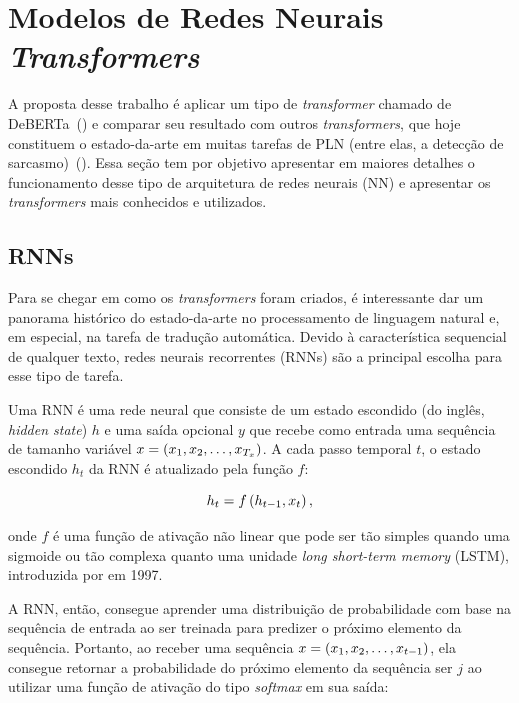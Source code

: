 \section{Modelos de Redes Neurais \textit{Transformers}}%
\label{sec:modelos_de_redes_neurais_transformers}

A proposta desse trabalho é aplicar um tipo de \textit{transformer} chamado de
DeBERTa~(\cite{he-etal:2020:deberta}) e comparar seu resultado com outros
\textit{transformers}, que hoje constituem o estado-da-arte em muitas tarefas de
PLN (entre elas, a detecção de
sarcasmo)~(\cite{joshi:2017:sarcasm-detection-survey}).  Essa seção tem por
objetivo apresentar em maiores detalhes o funcionamento desse tipo de
arquitetura de redes neurais (NN) e apresentar os \textit{transformers} mais
conhecidos e utilizados.

\subsection{RNNs}%
\label{sub:rnns}

Para se chegar em como os \textit{transformers} foram criados, é interessante
dar um panorama histórico do estado-da-arte no processamento de linguagem
natural e, em especial, na tarefa de tradução automática. Devido à
característica sequencial de qualquer texto, redes neurais recorrentes (RNNs)
são a principal escolha para esse tipo de tarefa.

Uma RNN é uma rede neural que consiste de um estado escondido (do inglês,
\textit{hidden state}) $h$ e uma saída opcional $y$ que recebe como entrada uma
sequência de tamanho variável $x=\left( x_1, x_2,\dots, x_{T_x} \right)$. A cada passo temporal
$t$, o estado escondido $h_t$ da RNN é atualizado pela função $f$:

\begin{equation}
h_t = f\left( h_{t-1}, x_t \right),
\label{eq:rnn}
\end{equation}

onde $f$ é uma função de ativação não linear que pode ser tão simples quando uma
sigmoide ou tão complexa quanto uma unidade \textit{long short-term memory}
(LSTM), introduzida por \cite{hochreiter-schmidhuber:1997:lstm} em 1997.

A RNN, então, consegue aprender uma distribuição de probabilidade com base na
sequência de entrada ao ser treinada para predizer o próximo elemento da
sequência. Portanto, ao receber uma sequência $x=\left( x_1, x_2,\dots, x_{t-1} \right)$, ela
consegue retornar a probabilidade do próximo elemento da sequência ser $j$ ao
utilizar uma função de ativação do tipo \textit{softmax} em sua saída:

